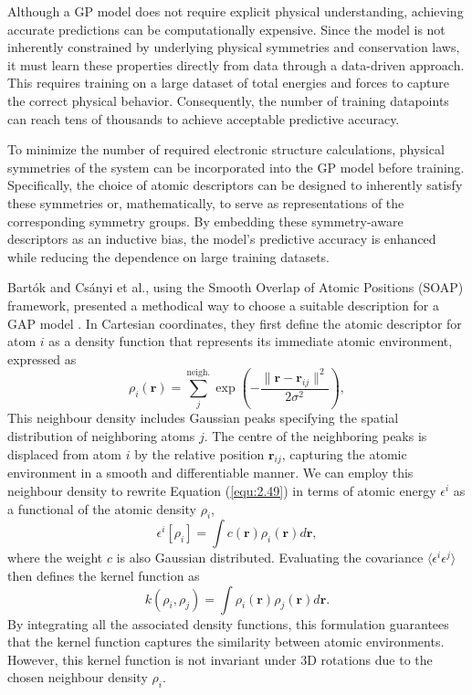 Although a GP model does not require explicit physical understanding, achieving accurate predictions can be computationally expensive.
Since the model is not inherently constrained by underlying physical symmetries and conservation laws, it must learn these properties directly from data through a data-driven approach.
This requires training on a large dataset of total energies and forces to capture the correct physical behavior.
Consequently, the number of training datapoints can reach tens of thousands to achieve acceptable predictive accuracy.

To minimize the number of required electronic structure calculations, physical symmetries of the system can be incorporated into the GP model before training.
Specifically, the choice of atomic descriptors can be designed to inherently satisfy these symmetries or, mathematically, to serve as representations of the corresponding symmetry groups.
By embedding these symmetry-aware descriptors as an inductive bias, the model's predictive accuracy is enhanced while reducing the dependence on large training datasets.

Bart\'{o}k and Cs\'{a}nyi et al., using the Smooth Overlap of Atomic Positions (SOAP) framework, presented a methodical way to choose a suitable description for a GAP model \cite{Bartk2013, Bartk2015}.
In Cartesian coordinates, they first define the atomic descriptor for atom $i$ as a density function that represents its immediate atomic environment, expressed as 
\begin{equation}
    \label{equ:2.52}
      \rho_{i}(\mathbf{r}) = \sum_{j}^{\text{neigh.}} 
      \exp\!\left(-\frac{\lVert\mathbf{r}-\mathbf{r}_{ij}\rVert^{2}}{2\sigma^{2}}\right),
\end{equation}
This neighbour density includes Gaussian peaks specifying the spatial distribution of neighboring atoms $j$.
The centre of the neighboring peaks is displaced from atom $i$ by the relative position $\textbf{r}_{ij}$, capturing the atomic environment in a smooth and differentiable manner.
We can employ this neighbour density to rewrite Equation (\ref{equ:2.49}) in terms of atomic energy $\epsilon^{i}$ as a functional of the atomic density $\rho_{i}$,
\begin{equation}
    \label{equ:2.53}
      \epsilon^{i}[\rho_{i}] = \int c(\textbf{r})\rho_{i}(\textbf{r})d\textbf{r},
\end{equation}
where the weight $c$ is also Gaussian distributed.
Evaluating the covariance $\langle\epsilon^{i}\epsilon^{j}\rangle$ then defines the kernel function as 
\begin{equation}
    \label{equ:2.54}
      k(\rho_{i}, \rho_{j}) = \int \rho_{i}(\textbf{r})\rho_{j}(\textbf{r})d\textbf{r}.
\end{equation}
By integrating all the associated density functions, this formulation guarantees that the kernel function captures the similarity between atomic environments. However, this kernel function is not invariant under 3D rotations due to the chosen neighbour density $\rho_{i}$. 

